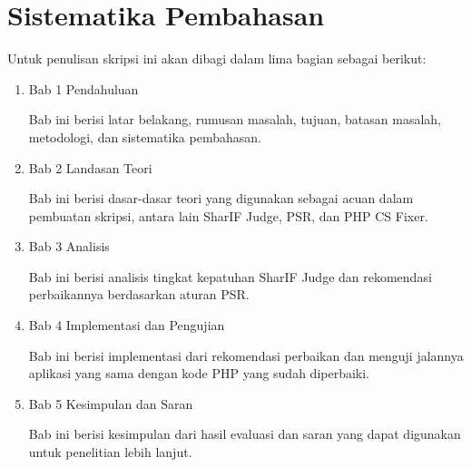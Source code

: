 \section{Sistematika Pembahasan}
\label{sec:sispem}
Untuk penulisan skripsi ini akan dibagi dalam lima bagian sebagai berikut:
\begin{enumerate}
	\item Bab 1 Pendahuluan 
	
	 Bab ini berisi latar belakang, rumusan masalah, tujuan, batasan masalah, metodologi, dan sistematika pembahasan.
	 
	 \item Bab 2 Landasan Teori
	 
	 Bab ini berisi dasar-dasar teori yang digunakan sebagai acuan dalam pembuatan skripsi, antara lain SharIF Judge, PSR, dan PHP CS Fixer.
	 
	 \item Bab 3 Analisis
	 
	 Bab ini berisi analisis tingkat kepatuhan SharIF Judge dan rekomendasi perbaikannya berdasarkan aturan PSR. 
	 
	 \item Bab 4 Implementasi dan Pengujian
	 
	 Bab ini berisi implementasi dari rekomendasi perbaikan dan menguji jalannya aplikasi yang sama dengan kode PHP yang sudah diperbaiki. 
	 
	 \item Bab 5 Kesimpulan dan Saran
	 
	 Bab ini berisi kesimpulan dari hasil evaluasi dan saran yang dapat digunakan untuk penelitian lebih lanjut.
	 
\end{enumerate}